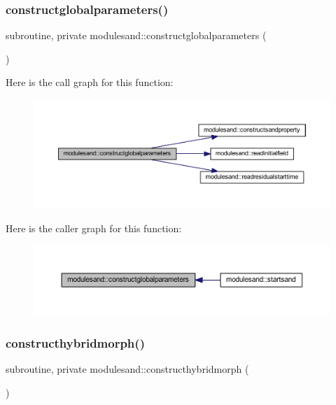 \subsubsection{\texorpdfstring{constructglobalparameters()}{constructglobalparameters()}}
{\footnotesize\ttfamily subroutine, private modulesand\+::constructglobalparameters (\begin{DoxyParamCaption}{ }\end{DoxyParamCaption})\hspace{0.3cm}{\ttfamily [private]}}

Here is the call graph for this function\+:\nopagebreak
\begin{figure}[H]
\begin{center}
\leavevmode
\includegraphics[width=350pt]{namespacemodulesand_a3f94338f096f34936302bce0d7d91189_cgraph}
\end{center}
\end{figure}
Here is the caller graph for this function\+:\nopagebreak
\begin{figure}[H]
\begin{center}
\leavevmode
\includegraphics[width=350pt]{namespacemodulesand_a3f94338f096f34936302bce0d7d91189_icgraph}
\end{center}
\end{figure}
\mbox{\label{namespacemodulesand_a5038864653c40852814080f8d2e82d7b}} 
\subsubsection{\texorpdfstring{constructhybridmorph()}{constructhybridmorph()}}
{\footnotesize\ttfamily subroutine, private modulesand\+::constructhybridmorph (\begin{DoxyParamCaption}{ }\end{DoxyParamCaption})\hspace{0.3cm}{\ttfamily [private]}}

